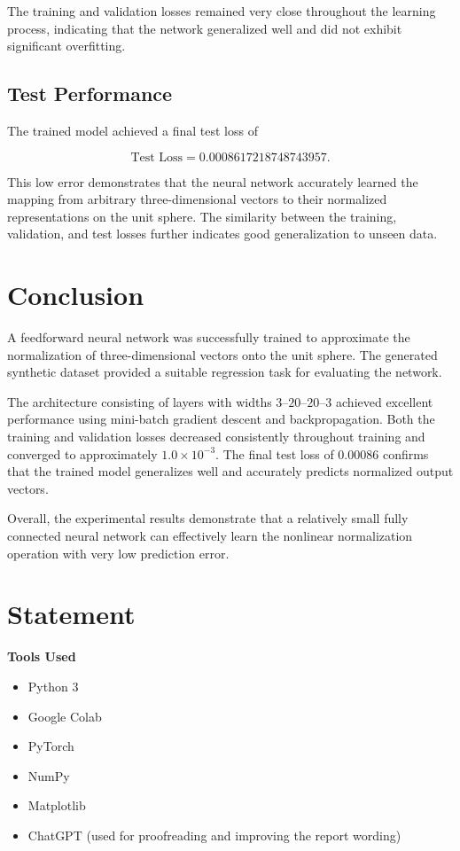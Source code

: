 \documentclass[conference,a4paper]{IEEEtran}
\begin{document}
The training and validation losses remained very close throughout the learning process, indicating that the network generalized well and did not exhibit significant overfitting.

\subsection{Test Performance}

The trained model achieved a final test loss of

\begin{equation}
	\text{Test Loss}=0.0008617218748743957.
\end{equation}

This low error demonstrates that the neural network accurately learned the mapping from arbitrary three-dimensional vectors to their normalized representations on the unit sphere. The similarity between the training, validation, and test losses further indicates good generalization to unseen data.

\section{Conclusion}

A feedforward neural network was successfully trained to approximate the normalization of three-dimensional vectors onto the unit sphere. The generated synthetic dataset provided a suitable regression task for evaluating the network.

The architecture consisting of layers with widths $3$--$20$--$20$--$3$ achieved excellent performance using mini-batch gradient descent and backpropagation. Both the training and validation losses decreased consistently throughout training and converged to approximately $1.0\times10^{-3}$. The final test loss of $0.00086$ confirms that the trained model generalizes well and accurately predicts normalized output vectors.

Overall, the experimental results demonstrate that a relatively small fully connected neural network can effectively learn the nonlinear normalization operation with very low prediction error.

\section{Statement}

\textbf{Tools Used}
\begin{itemize}
	\item Python 3
	\item Google Colab
	\item PyTorch
	\item NumPy
	\item Matplotlib
	\item ChatGPT \cite{chatgpt2026} (used for proofreading and improving the report wording)
\end{itemize}
\end{document}
